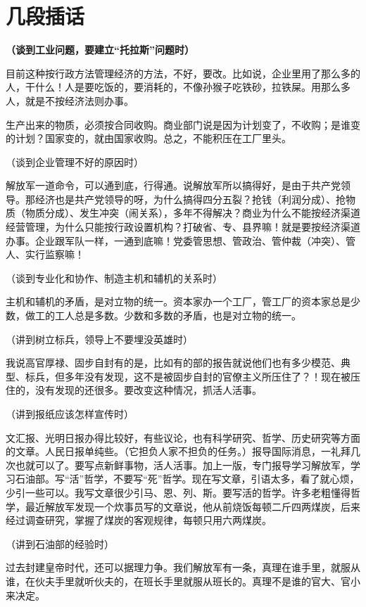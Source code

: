 \section[几段插话（一九六四年一月）]{几段插话}


\textbf{（谈到工业问题，要建立“托拉斯”问题时）}

目前这种按行政方法管理经济的方法，不好，要改。比如说，企业里用了那么多的人，干什么！人是要吃饭的，要消耗的，不像孙猴子吃铁砂，拉铁屎。用那么多人，就是不按经济法则办事。

生产出来的物质，必须按合同收购。商业部门说是因为计划变了，不收购；是谁变的计划？国家变的，就由国家收购。总之，不能积压在工厂里头。

（谈到企业管理不好的原因时）

解放军一道命令，可以通到底，行得通。说解放军所以搞得好，是由于共产党领导。那经济也是共产党领导的呀，为什么搞得四分五裂？抢钱（利润分成）、抢物质（物质分成）、发生冲突（闹关系），多年不得解决？商业为什么不能按经济渠道经营管理，为什么只能按行政设置机构？打破省、专、县界嘛！就是要按经济渠道办事。企业跟军队一样，一通到底嘛！党委管思想、管政治、管仲裁（冲突）、管人、实行监察嘛！

（谈到专业化和协作、制造主机和辅机的关系时）

主机和辅机的矛盾，是对立物的统一。资本家办一个工厂，管工厂的资本家总是少数，做工的工人总是多数。少数和多数的矛盾，也是对立物的统一。

（讲到树立标兵，领导上不要埋没英雄时）

我说高官厚禄、固步自封有的是，比如有的部的报告就说他们也有多少模范、典型、标兵，但多年没有发现，这不是被固步自封的官僚主义所压住了？！现在被压住的，没有发现的还很多。要改变这种情况，抓活人活事。

（讲到报纸应该怎样宣传时）

文汇报、光明日报办得比较好，有些议论，也有科学研究、哲学、历史研究等方面的文章。人民日报单纯些。（它担负人家不担负的任务。）报导国际消息，一礼拜几次也就可以了。要写点新鲜事物，活人活事。加上一版，专门报导学习解放军，学习石油部。写“活”哲学，不要写“死”哲学。现在写文章，引语太多，看了就心烦，少引一些可以。我写文章很少引马、恩、列、斯。要写活的哲学。许多老粗懂得哲学，最近解放军发现一个炊事员写的文章说，他从前烧饭每顿二斤四两煤炭，后来经过调查研究，掌握了煤炭的客观规律，每顿只用六两煤炭。

（讲到石油部的经验时）

过去封建皇帝时代，还可以据理力争。我们解放军有一条，真理在谁手里，就服从谁，在伙夫手里就听伙夫的，在班长手里就服从班长的。真理不是谁的官大、官小来决定。

